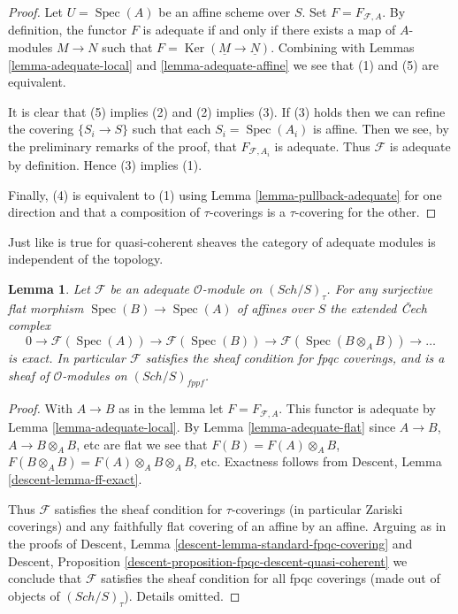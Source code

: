 \documentclass{stacks-project}
\theoremstyle{plain}
\newtheorem{lemma}[subsection]{Lemma}
\theoremstyle{definition}
\theoremstyle{remark}
\numberwithin{equation}{subsection}
\def\Spec{\mathop{\mathrm{Spec}}}
\def\Sch{\mathit{Sch}}
\def\Ker{\mathop{\mathrm{Ker}}}
\begin{document}
\begin{proof}
Let $U = \Spec(A)$ be an affine scheme over $S$.
Set $F = F_{\mathcal{F}, A}$. By definition, the functor
$F$ is adequate if and only if there exists a map of $A$-modules
$M \to N$ such that $F = \Ker(\underline{M} \to \underline{N})$.
Combining with
Lemmas \ref{lemma-adequate-local} and
\ref{lemma-adequate-affine}
we see that (1) and (5) are equivalent.

\medskip\noindent
It is clear that (5) implies (2) and (2) implies (3).
If (3) holds then we can refine the covering
$\{S_i \to S\}$ such that each $S_i = \Spec(A_i)$ is affine.
Then we see, by the preliminary remarks of the proof, that
$F_{\mathcal{F}, A_i}$ is adequate. Thus $\mathcal{F}$
is adequate by definition. Hence (3) implies (1).

\medskip\noindent
Finally, (4) is equivalent to (1) using
Lemma \ref{lemma-pullback-adequate}
for one direction and that
a composition of $\tau$-coverings is a $\tau$-covering for the other.
\end{proof}

\noindent
Just like is true for quasi-coherent sheaves the category of
adequate modules is independent of the topology.

\begin{lemma}
\label{lemma-adequate-fpqc}
Let $\mathcal{F}$ be an adequate $\mathcal{O}$-module on
$(\Sch/S)_\tau$. For any surjective flat morphism
$\Spec(B) \to \Spec(A)$ of affines over $S$
the extended {\v C}ech complex
$$
0 \to \mathcal{F}(\Spec(A)) \to
\mathcal{F}(\Spec(B)) \to
\mathcal{F}(\Spec(B \otimes_A B)) \to \ldots
$$
is exact. In particular $\mathcal{F}$ satisfies the sheaf condition
for fpqc coverings, and is a sheaf of $\mathcal{O}$-modules
on $(\Sch/S)_{fppf}$.
\end{lemma}

\begin{proof}
With $A \to B$ as in the lemma let $F = F_{\mathcal{F}, A}$. This functor
is adequate by
Lemma \ref{lemma-adequate-local}.
By
Lemma \ref{lemma-adequate-flat}
since $A \to B$, $A \to B \otimes_A B$, etc are flat we see that
$F(B) = F(A) \otimes_A B$,
$F(B \otimes_A B) = F(A) \otimes_A B \otimes_A B$, etc.
Exactness follows from
Descent, Lemma \ref{descent-lemma-ff-exact}.

\medskip\noindent
Thus $\mathcal{F}$ satisfies the sheaf condition for
$\tau$-coverings (in particular Zariski coverings) and any faithfully
flat covering of an affine by an affine. Arguing as in the proofs of
Descent, Lemma \ref{descent-lemma-standard-fpqc-covering}
and
Descent, Proposition \ref{descent-proposition-fpqc-descent-quasi-coherent}
we conclude that $\mathcal{F}$ satisfies the sheaf condition for all
fpqc coverings (made out of objects of $(\Sch/S)_\tau$).
Details omitted.
\end{proof}
\end{document}
